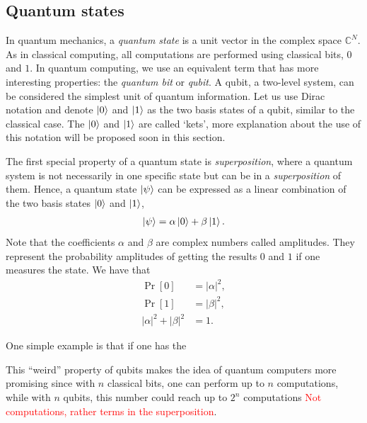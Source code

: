 \documentclass[cryptography,review,submit,pdftex,moreauthors,amsmath,amssymb,aps,strict]{Definitions/mdpi}
\newcommand{\peter}[1]{\textcolor{red}{#1}}
\begin{document}
\subsection{Quantum states}

In quantum mechanics, a \textit{quantum state} is a unit vector in the complex space $\mathbb{C}^N$.
As in classical computing, all computations are performed using classical bits, $0$ and $1$. In quantum computing, we use an equivalent term that has more interesting properties: the \textit{quantum bit} or \textit{qubit}. A qubit, a two-level system, can be considered the simplest unit of quantum information. Let us use Dirac notation and denote $\ket{0}$ and $\ket{1}$ as the two basis states of a qubit, similar to the classical case. The $\ket{0}$ and $\ket{1}$ are called `kets', more explanation about the use of this notation will be proposed soon in this section.

The first special property of a quantum state is \textit{superposition}, where a quantum system is not necessarily in one specific state but can be in a \textit{superposition} of them. Hence, a quantum state $\ket{\psi}$ can be expressed as a linear combination of the two basis states $\ket{0}$ and $\ket{1}$,
\begin{align}
\ket{\psi}=\alpha\ket{0}+\beta\ket{1}.
\label{eq:quantumstate}
\end{align}
Note that the coefficients $\alpha$ and $\beta$ are complex numbers called amplitudes. They represent the probability amplitudes of getting the results $0$ and $1$ if one measures the state. We have that
\begin{align}
\Pr[0] &= |\alpha|^2,\nonumber\\
\Pr[1] &= |\beta|^2,\nonumber\\
|\alpha|^2 + |\beta|^2 &= 1.
\end{align}

One simple example is that if one has the 

This ``weird'' property of qubits makes the idea of quantum computers more promising since with $n$ classical bits, one can perform up to $n$ computations, while with $n$ qubits, this number could reach up to $2^n$ computations \peter{Not computations, rather terms in the superposition}.
\end{document}
